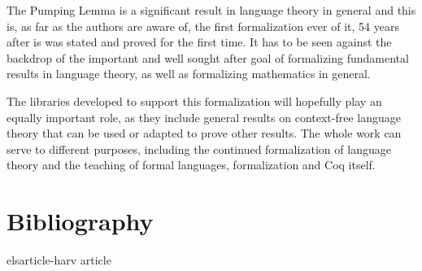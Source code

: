 \documentclass {elsarticle}
\begin{document}
The Pumping Lemma is a significant result in language theory in general and this is, as far as the authors are aware of, the first formalization ever of it, 54 years after is was stated and proved for the first time. It has to be seen against the backdrop of the important and well sought after goal of formalizing fundamental results in language theory, as well as formalizing mathematics in general.

The libraries developed to support this formalization will hopefully play an equally important role, as they include general results on context-free language theory that can be used or adapted to prove other results. The whole work can serve to different purposes, including the continued formalization of language theory and the teaching of formal languages, formalization and Coq itself.

\section*{Bibliography}
 {elsarticle-harv}
 {article}
\end{document}
